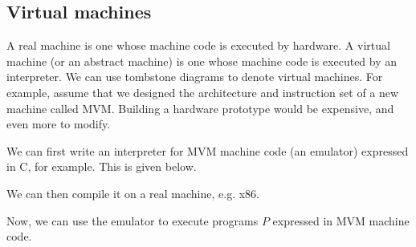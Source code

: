 \documentclass[a4paper, openany]{memoir}
\begin{document}
\subsection{Virtual machines}
A real machine is one whose machine code is executed by hardware. A virtual machine (or an abstract machine) is one whose machine code is executed by an interpreter. We can use tombstone diagrams to denote virtual machines. For example, assume that we designed the architecture and instruction set of a new machine called MVM. Building a hardware prototype would be expensive, and even more to modify.

We can first write an interpreter for MVM machine code (an emulator) expressed in C, for example. This is given below.
\begin{figure}[H]
    \centering
\end{figure}
\noindent We can then compile it on a real machine, e.g. x86.
\begin{figure}[H]
    \centering
\end{figure}
\noindent Now, we can use the emulator to execute programs $P$ expressed in MVM machine code.
\end{document}
